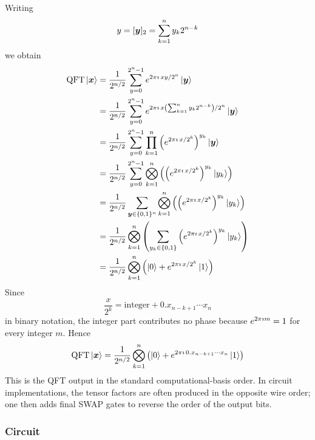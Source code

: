 Writing
\[
y=[{\boldsymbol{y}}]_2
=
\sum_{k=1}^n y_k 2^{n-k}
\]
we obtain
\[
\begin{aligned}
\operatorname{QFT}\ket{\vect{x}}
&=
\frac{1}{2^{n/2}}
\sum_{y=0}^{2^n-1}
\eu^{2\pi\iu\,xy/2^n}
\ket{\vect{y}}
\\
&=
\frac{1}{2^{n/2}}
\sum_{y=0}^{2^n-1}
\eu^{2\pi\iu\,x\left(\sum_{k=1}^n y_k 2^{n-k}\right)/2^n}
\ket{\vect{y}}
\\
&=
\frac{1}{2^{n/2}}
\sum_{y=0}^{2^n-1}
\prod_{k=1}^n
\left(
\eu^{2\pi\iu\,x/2^k}
\right)^{y_k}
\ket{\vect{y}}
\\
&=
\frac{1}{2^{n/2}}
\sum_{y=0}^{2^n-1}
\bigotimes_{k=1}^n
\left(
\left(
\eu^{2\pi\iu\,x/2^k}
\right)^{y_k}
\ket{y_k}
\right)
\\
&=
\frac{1}{2^{n/2}}
\sum_{\vect{y} \in\{0,1\}^n}
\bigotimes_{k=1}^n
\left(
\left(
\eu^{2\pi\iu\,x/2^k}
\right)^{y_k}
\ket{y_k}
\right)
\\
&= %
\frac{1}{2^{n/2}}
\bigotimes_{k=1}^n
\left(
\sum_{y_k\in\{0,1\}}
\left(
\eu^{2\pi\iu\,x/2^k}
\right)^{y_k}
\ket{y_k}
\right)
\\
&=
\frac{1}{2^{n/2}}
\bigotimes_{k=1}^n
\left(
\ket0
+
\eu^{2\pi\iu\,x/2^k}\ket1
\right)
\end{aligned}
\]
Since
\[
\frac{x}{2^k}
=
\text{integer}
+
0.x_{n-k+1}\cdots x_n
\]
in binary notation, the integer part contributes no phase because
\(
e^{2\pi\imath m}=1
\)
for every integer \(m\).
Hence
\[
\operatorname{QFT}\ket{{\boldsymbol{x}}}
=
\frac{1}{2^{n/2}}
\bigotimes_{k=1}^n
\left(
\ket0
+
e^{2\pi\imath\,0.x_{n-k+1}\cdots x_n}
\ket1
\right)
\]
This is the QFT output in the standard computational-basis order.
In circuit implementations, the tensor factors are often produced in the opposite wire order; 
one then adds final SWAP gates to reverse the order of the output bits.

\subsubsection*{Circuit}

